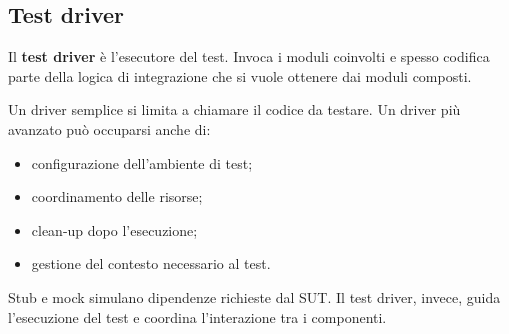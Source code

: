 \subsection{Test driver}

Il \textbf{test driver} è l'esecutore del test. Invoca i moduli coinvolti e spesso codifica parte della logica di integrazione che si vuole ottenere dai moduli composti.

Un driver semplice si limita a chiamare il codice da testare. Un driver più avanzato può occuparsi anche di:

\begin{itemize}
    \item configurazione dell'ambiente di test;
    \item coordinamento delle risorse;
    \item clean-up dopo l'esecuzione;
    \item gestione del contesto necessario al test.
\end{itemize}

\begin{notaesame}
Stub e mock simulano dipendenze richieste dal SUT. Il test driver, invece, guida l'esecuzione del test e coordina l'interazione tra i componenti.
\end{notaesame}
